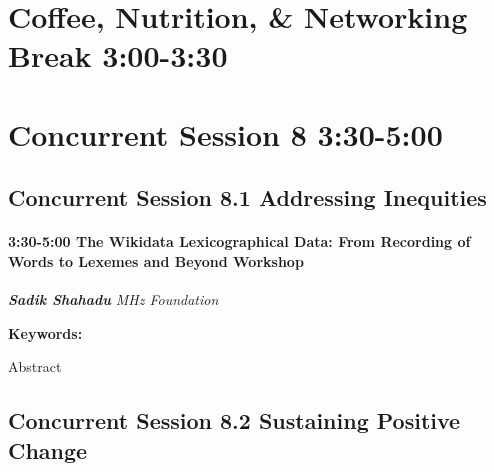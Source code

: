 \documentclass[
]{book}
\begin{document}
\hypertarget{coffee-nutrition-networking-break-300-330-1}{%
\section*{Coffee, Nutrition, \& Networking Break \textbar{} 3:00-3:30}\label{coffee-nutrition-networking-break-300-330-1}}

\hypertarget{concurrent-session-8-330-500}{%
\section*{Concurrent Session 8 \textbar{} 3:30-5:00}\label{concurrent-session-8-330-500}}

\hypertarget{concurrent-session-8.1-addressing-inequities}{%
\subsection*{Concurrent Session 8.1 \textbar{} Addressing Inequities}\label{concurrent-session-8.1-addressing-inequities}}

\begin{workshop}
\hypertarget{the-wikidata-lexicographical-data-from-recording-of-words-to-lexemes-and-beyond-workshop}{%
\paragraph*{\texorpdfstring{3:30-5:00 \textbar{} \textbf{The Wikidata
Lexicographical Data: From Recording of Words to Lexemes and Beyond}
\textbar{}
Workshop}{3:30-5:00 \textbar{} The Wikidata Lexicographical Data: From Recording of Words to Lexemes and Beyond \textbar{} Workshop}}\label{the-wikidata-lexicographical-data-from-recording-of-words-to-lexemes-and-beyond-workshop}}

\textbf{\emph{Sadik Shahadu}} \textbar{} \emph{MHz Foundation}

\textbf{Keywords:}

Abstract
\end{workshop}

\hypertarget{concurrent-session-8.2-sustaining-positive-change}{%
\subsection*{Concurrent Session 8.2 \textbar{} Sustaining Positive Change}\label{concurrent-session-8.2-sustaining-positive-change}}
\end{document}
